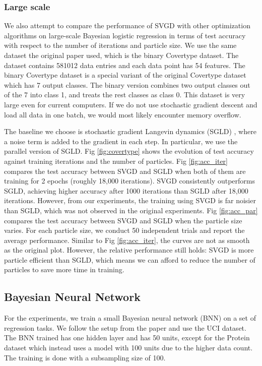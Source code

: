 

\subsubsection{Large scale}
We also attempt to compare the performance of SVGD with other optimization algorithms on large-scale Bayesian logistic regression in terms of test accuracy with respect to the number of iterations and particle size. We use the same dataset the original paper used, which is the binary Covertype dataset. The dataset contains 581012 data entries and each data point has 54 features. The binary Covertype dataset is a special variant of the original Covertype dataset which has 7 output classes. The binary version combines two output classes out of the 7 into class 1, and treats the rest classes as class 0. This dataset is very large even for current computers. If we do not use stochastic gradient descent and load all data in one batch, we would most likely encounter memory overflow. 

The baseline we choose is stochastic gradient Langevin dynamics (SGLD) \cite{ref_sgld}, where a noise term is added to the gradient in each step. In particular, we use the parallel version of SGLD. Fig \ref{fig:covertype} shows the evolution of test accuracy against training iterations and the number of particles. Fig \ref{fig:acc_iter} compares the test accuracy between SVGD and SGLD when both of them are training for 2 epochs (roughly 18,000 iterations). SVGD consistently outperforms SGLD, achieving higher accuracy after 1000 iterations than SGLD after 18,000 iterations. However, from our experiments, the training using SVGD is far noisier than SGLD, which was not observed in the original experiments. Fig \ref{fig:acc_par} compares the test accuracy between SVGD and SGLD when the particle size varies. For each particle size, we conduct 50 independent trials and report the average performance. Similar to Fig \ref{fig:acc_iter}, the curves are not as smooth as the original plot. However, the relative performance still holds: SVGD is more particle efficient than SGLD, which means we can afford to reduce the number of particles to save more time in training.


\subsection{Bayesian Neural Network}

For the experiments, we train a small Bayesian neural network (BNN) on a set of regression tasks. We follow the setup from the paper and use the UCI dataset. The BNN trained has one hidden layer and has 50 units, except for the Protein dataset which instead uses a model with 100 units due to the higher data count. The training is done with a subsampling size of 100.

